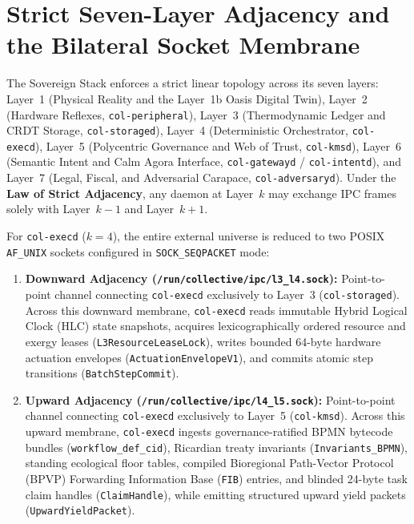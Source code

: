 \section{Strict Seven-Layer Adjacency and the Bilateral Socket Membrane}
\label{sec:ch1-bilateral-sockets}

The Sovereign Stack enforces a strict linear topology across its seven layers: Layer~1
(Physical Reality and the Layer~1b Oasis Digital Twin), Layer~2 (Hardware Reflexes,
\texttt{col-peripheral}), Layer~3 (Thermodynamic Ledger and CRDT Storage,
\texttt{col-storaged}), Layer~4 (Deterministic Orchestrator, \texttt{col-execd}), Layer~5
(Polycentric Governance and Web of Trust, \texttt{col-kmsd}), Layer~6 (Semantic Intent and
Calm Agora Interface, \texttt{col-gatewayd} / \texttt{col-intentd}), and Layer~7 (Legal,
Fiscal, and Adversarial Carapace, \texttt{col-adversaryd}). Under the \textbf{Law of Strict
Adjacency}, any daemon at Layer~$k$ may exchange IPC frames solely with Layer~$k-1$ and
Layer~$k+1$.

For \texttt{col-execd} ($k = 4$), the entire external universe is reduced to two POSIX
\texttt{AF\_UNIX} sockets configured in \texttt{SOCK\_SEQPACKET} mode:

\begin{enumerate}
\item \textbf{Downward Adjacency (\texttt{/run/collective/ipc/l3\_l4.sock}):} Point-to-point
        channel connecting \texttt{col-execd} exclusively to Layer~3
        (\texttt{col-storaged}). Across this downward membrane, \texttt{col-execd} reads
        immutable Hybrid Logical Clock (HLC) state snapshots, acquires lexicographically
        ordered resource and exergy leases (\texttt{L3ResourceLeaseLock}), writes bounded
        64-byte hardware actuation envelopes (\texttt{ActuationEnvelopeV1}), and commits
        atomic step transitions (\texttt{BatchStepCommit}).
\item \textbf{Upward Adjacency (\texttt{/run/collective/ipc/l4\_l5.sock}):} Point-to-point
        channel connecting \texttt{col-execd} exclusively to Layer~5 (\texttt{col-kmsd}).
        Across this upward membrane, \texttt{col-execd} ingests governance-ratified BPMN
        bytecode bundles (\texttt{workflow\_def\_cid}), Ricardian treaty invariants
        (\texttt{Invariants\_BPMN}), standing ecological floor tables, compiled Bioregional
        Path-Vector Protocol (BPVP) Forwarding Information Base (\texttt{FIB}) entries, and
        blinded 24-byte task claim handles (\texttt{ClaimHandle}), while emitting structured
        upward yield packets (\texttt{UpwardYieldPacket}).
\end{enumerate}

